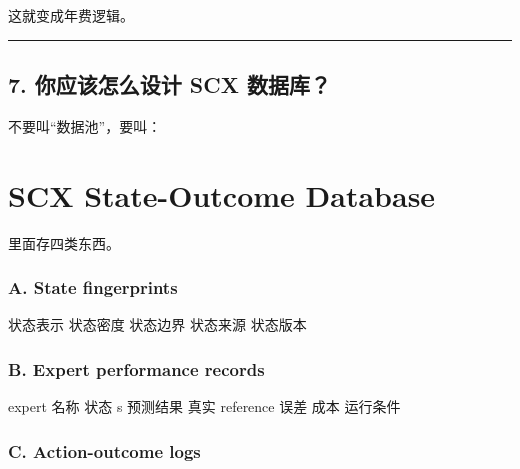 \documentclass[
  12pt,
]{ctexart}
\newenvironment{Shaded}{}{}
\newcommand{\NormalTok}[1]{#1}
\begin{document}
这就变成年费逻辑。

\begin{center}\rule{0.5\linewidth}{0.5pt}\end{center}

\subsection{7. 你应该怎么设计 SCX
数据库？}\label{ux4f60ux5e94ux8be5ux600eux4e48ux8bbeux8ba1-scx-ux6570ux636eux5e93}

不要叫``数据池''，要叫：

\section{\texorpdfstring{\textbf{SCX State-Outcome
Database}}{SCX State-Outcome Database}}\label{scx-state-outcome-database}

里面存四类东西。

\subsubsection{A. State fingerprints}\label{a.-state-fingerprints}

\begin{Shaded}
\begin{Highlighting}[]
\NormalTok{状态表示}
\NormalTok{状态密度}
\NormalTok{状态边界}
\NormalTok{状态来源}
\NormalTok{状态版本}
\end{Highlighting}
\end{Shaded}

\subsubsection{B. Expert performance
records}\label{b.-expert-performance-records}

\begin{Shaded}
\begin{Highlighting}[]
\NormalTok{expert 名称}
\NormalTok{状态 s}
\NormalTok{预测结果}
\NormalTok{真实 reference}
\NormalTok{误差}
\NormalTok{成本}
\NormalTok{运行条件}
\end{Highlighting}
\end{Shaded}

\subsubsection{C. Action-outcome logs}\label{c.-action-outcome-logs}
\end{document}
